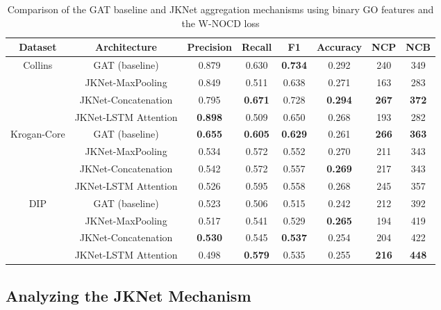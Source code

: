 \begin{table}[t]
	\centering
	\caption{Comparison of the GAT baseline and JKNet aggregation mechanisms using binary GO features and the W-NOCD loss}
	\label{table:jknet_binary}
	\footnotesize
	\vspace{2mm}
	\begin{tabular}{c|c|c|c|c|c|c|c}
		\hline
		\textbf{Dataset} & \textbf{Architecture} & \textbf{Precision} &
		\textbf{Recall} & \textbf{F1} & \textbf{Accuracy} &
		\textbf{NCP} & \textbf{NCB} \\
		\hline
		
		\multirow{4}{*}{Collins}
		& GAT (baseline) & 0.879 & 0.630 & \textbf{0.734} & 0.292 & 240 & 349 \\
		& JKNet-MaxPooling & 0.849 & 0.511 & 0.638 & 0.271 & 163 & 283 \\
		& JKNet-Concatenation & 0.795 & \textbf{0.671} & 0.728 & \textbf{0.294} & \textbf{267} & \textbf{372} \\
		& JKNet-LSTM Attention & \textbf{0.898} & 0.509 & 0.650 & 0.268 & 193 & 282 \\
		\hline
		
		\multirow{4}{*}{Krogan-Core}
		& GAT (baseline) & \textbf{0.655} & \textbf{0.605} & \textbf{0.629} & 0.261 & \textbf{266} & \textbf{363} \\
		& JKNet-MaxPooling & 0.534 & 0.572 & 0.552 & 0.270 & 211 & 343 \\
		& JKNet-Concatenation & 0.542 & 0.572 & 0.557 & \textbf{0.269} & 217 & 343 \\
		& JKNet-LSTM Attention & 0.526 & 0.595 & 0.558 & 0.268 & 245 & 357 \\
		\hline
		
		\multirow{4}{*}{DIP}
		& GAT (baseline) & 0.523 & 0.506 & 0.515 & 0.242 & 212 & 392 \\
		& JKNet-MaxPooling & 0.517 & 0.541 & 0.529 & \textbf{0.265} & 194 & 419 \\
		& JKNet-Concatenation & \textbf{0.530} & 0.545 & \textbf{0.537} & 0.254 & 204 & 422 \\
		& JKNet-LSTM Attention & 0.498 & \textbf{0.579} & 0.535 & 0.255 & \textbf{216} & \textbf{448} \\
		\hline
	\end{tabular}
\end{table}



\subsection{Analyzing the JKNet Mechanism}

